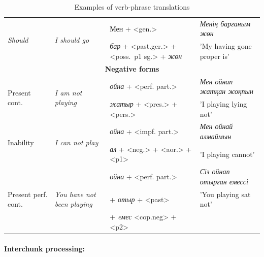 \documentclass[11pt]{article}
\begin{document}
\begin{table}
\begin{small}
\begin{tabular}{|l|l|l|l|}
    \hline
    \multirow{2}{*}{\emph{Should}} & \multirow{2}{*}{\emph{I should go}} & Мен  + <gen.>  & \emph{Менің барғаным жөн} \\
                                    &                         & \emph{бар} + <past.ger.> +  <poss.\ p1 sg.> + \emph{жөн} & 'My having gone proper is' \\
    \hline
    \multicolumn{4}{|c|}{\textbf{Negative forms}} \\
    \hline
    \multirow{2}{*}{Present cont.} & \multirow{2}{*}{\emph{I am not playing}} & \emph{ойна} + <perf. part.>  & \emph{Мен ойнап жатқан жоқпын} \\
                                    &                         &   \emph{жатыр} + <pres.> + <pers.>     & 'I playing lying not' \\
    \hline
    \multirow{2}{*}{Inability} & \multirow{2}{*}{\emph{I can not play}} & \emph{ойна} + <impf. part.>  & \emph{Мен ойнай алмаймын} \\
                                    &                         &   \emph{ал} + <neg.> + <aor.> + <p1>     & 'I playing cannot' \\
    \hline
    \multirow{3}{*}{Present perf. cont. } & \multirow{3}{*}{\emph{You have not been playing}} & \emph{ойна} + <perf. part.>  & \emph{Сіз ойнап отырған емессі} \\
                                    &                         & +  \emph{отыр} + <past>  & 'You playing sat not'  \\
                                    &                         & + \emph{eмес} <cop.neg> + <p2> & \\
    \hline
    
     
  \end{tabular}
  \end{small}
  \caption{Examples of verb-phrase translations}
  \label{table:vps}
\end{table}

\paragraph{Interchunk processing:}
\end{document}
